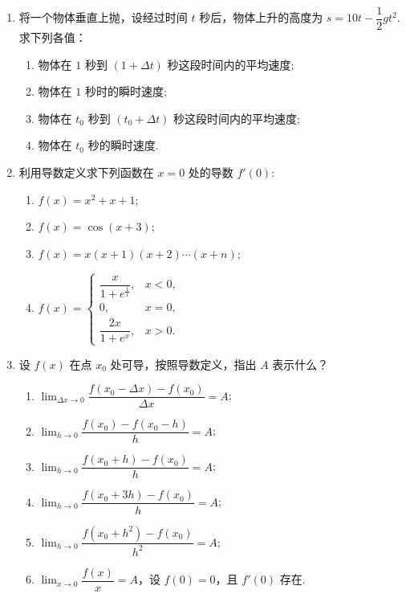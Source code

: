 \begin{enumerate}\setlength{\itemsep}{7pt}
    \item 将一个物体垂直上抛，设经过时间 $t$ 秒后，物体上升的高度为 $s=10t-\dfrac{1}{2}gt^2$. 
    求下列各值：
    \begin{enumerate}[(1)]\setlength{\itemsep}{5pt}\setlength{\topsep}{15pt}
        \item 物体在 $1$ 秒到 $(1+\Delta t)$ 秒这段时间内的平均速度;
        \item 物体在 $1$ 秒时的瞬时速度;
        \item 物体在 $t_0$ 秒到 $(t_0+\Delta t)$ 秒这段时间内的平均速度;
        \item 物体在 $t_0$ 秒的瞬时速度.
    \end{enumerate}

    \item 利用导数定义求下列函数在 $x=0$ 处的导数 $f'(0)$:
    \begin{enumerate}[(1)]\setlength{\itemsep}{5pt}\setlength{\topsep}{15pt}
        \item $f(x)=x^2+x+1$;
        \item $f(x)=\cos(x+3)$;
        \item $f(x)=x(x+1)(x+2)\cdots(x+n)$;
        \item $f(x)=\begin{cases}
            \dfrac{x}{1+e^{\frac{1}{x}}},&x<0,\\
            0,&x=0,\\
            \dfrac{2x}{1+e^x},&x>0.
        \end{cases}$
    \end{enumerate}

    \item 设 $f(x)$ 在点 $x_0$ 处可导，按照导数定义，指出 $A$ 表示什么？
    \begin{enumerate}[(1)]\setlength{\itemsep}{5pt}\setlength{\topsep}{15pt}
        \item $\displaystyle\lim_{\Delta x\to0}\dfrac{f(x_0-\Delta x)-f(x_0)}{\Delta x}=A$;
        \item $\displaystyle\lim_{h\to0}\dfrac{f(x_0)-f(x_0-h)}{h}=A$;
        \item $\displaystyle\lim_{h\to0}\dfrac{f(x_0+h)-f(x_0)}{h}=A$;
        \item $\displaystyle\lim_{h\to0}\dfrac{f(x_0+3h)-f(x_0)}{h}=A$;
        \item $\displaystyle\lim_{h\to0}\dfrac{f(x_0+h^2)-f(x_0)}{h^2}=A$;
        \item $\displaystyle\lim_{x\to0}\dfrac{f(x)}{x}=A$，设 $f(0)=0$，且 $f'(0)$ 存在.
    \end{enumerate}


\end{enumerate}
